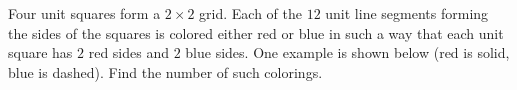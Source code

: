 Four unit squares form a $2\times 2$ grid. Each of the $12$ unit line segments forming the sides of the squares is colored either red or blue in such a way that each unit square has $2$ red sides and $2$ blue sides. One example is shown below (red is solid, blue is dashed). Find the number of such colorings.


